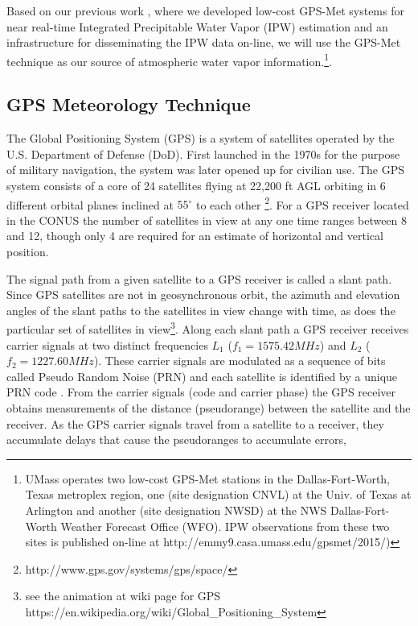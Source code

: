 \documentclass[proposal]{umassthesis}
\begin{document}
Based on our previous work \cite{nagarajan2015lowcost}, where we developed low-cost GPS-Met systems for near real-time Integrated Precipitable Water Vapor (IPW) estimation and an infrastructure for disseminating the IPW data on-line, we will use the GPS-Met technique as our source of atmospheric water vapor information.\footnote{UMass operates two low-cost GPS-Met stations in the Dallas-Fort-Worth, Texas metroplex region, one (site designation CNVL) at the Univ. of Texas at Arlington and another (site designation NWSD) at the NWS Dallas-Fort-Worth Weather Forecast Office (WFO). IPW observations from these two sites is published on-line at http://emmy9.casa.umass.edu/gpsmet/2015/)}.

\subsection{GPS Meteorology Technique}
The Global Positioning System (GPS) is a system of satellites operated by the U.S. Department of Defense (DoD). First launched in the 1970s for the purpose of military navigation, the system was later opened up for civilian use. The GPS system consists of a core of 24 satellites flying at 22,200 ft AGL orbiting in 6 different orbital planes inclined at $55^{\circ}$ to each other \footnote{http://www.gps.gov/systems/gps/space/}. For a GPS receiver located in the CONUS the number of satellites in view at any one time ranges between 8 and 12, though only 4 are required for an estimate of horizontal and vertical position.

The signal path from a given satellite to a GPS receiver is called a slant path. Since GPS satellites are not in geosynchronous orbit, the azimuth and elevation angles of the slant paths to the satellites in view change with time, as does the particular set of satellites in view\footnote{see the animation at wiki page for GPS https://en.wikipedia.org/wiki/Global\_Positioning\_System}. Along each slant path a GPS receiver receives carrier signals at two distinct frequencies $L_1$ ($f_1 = 1575.42 MHz$) and $L_2$ ($f_2 = 1227.60 MHz$). These carrier signals are modulated as a sequence of bits called Pseudo Random Noise (PRN) and each satellite is identified by a unique PRN code \cite{hoffman2008gnss}. From the carrier signals (code and carrier phase) the GPS receiver obtains measurements of the distance (pseudorange) between the satellite and the receiver. As the GPS carrier signals travel from a satellite to a receiver, they accumulate delays that cause the pseudoranges to accumulate errors,
\end{document}
